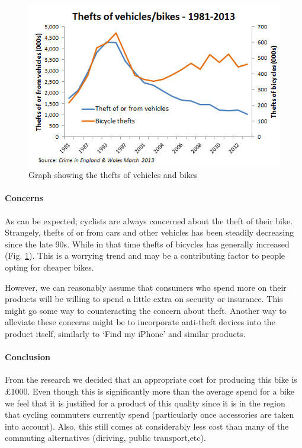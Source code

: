 \documentclass[]{report}
\begin{document}
\begin{figure}
\centering
\includegraphics[scale=0.8]{figures/cycle-theft}
\caption{Graph showing the thefts of vehicles and bikes \cite{ctc-stats}}
\label{fig:theft_graph}
\end{figure}
\paragraph{Concerns}
As can be expected; cyclists are always concerned about the theft of their bike. Strangely, thefts of or from cars and other vehicles has been steadily decreasing since the late 90s. While in that time thefts of bicycles has generally increased (Fig. \ref{fig:theft_graph}). This is a worrying trend and may be a contributing factor to people opting for cheaper bikes.

However, we can reasonably assume that consumers who spend more on their products will be  willing to spend a little extra on security or insurance. This might go some way to counteracting the concern about theft. Another way to alleviate these concerns might be to incorporate anti-theft devices into the product itself, similarly to ‘Find my iPhone’ and similar products.
\paragraph{Conclusion}
From the research we decided that an appropriate cost for producing this bike is \pounds1000. Even though this is significantly more than the average spend for a bike we feel that it is justified for a product of this quality since it is in the region that cycling commuters currently spend (particularly once accessories are taken into account). Also, this still comes at considerably less cost than many of the commuting alternatives (diriving, public transport,etc).
\end{document}

